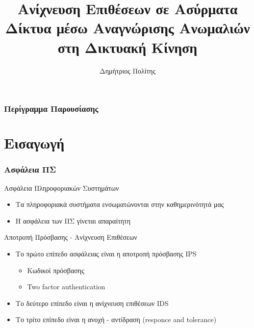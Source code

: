 \documentclass[handouts,hyperref={pdfpagelabels=false}]{beamer}
\begin{document}

\title{Ανίχνευση Επιθέσεων σε Ασύρματα Δίκτυα μέσω Αναγνώρισης Ανωμαλιών στη Δικτυακή Κίνηση}
\author{Δημήτριος Πολίτης}

\begin{frame}
\titlepage
\end{frame}

\begin{frame}
\frametitle{Περίγραμμα Παρουσίασης}
\tableofcontents
\end{frame}

\section{\foreignlanguage{greek}{Εισαγωγή}}
\begin{frame}
\frametitle{\foreignlanguage{greek}{Ασφάλεια ΠΣ}}

\begin{block}{Ασφάλεια Πληροφοριακών Συστημάτων}
\begin{itemize}
  \item Τα πληροφοριακά συστήματα ενσωματώνονται στην καθημερινότητά μας
  \item Η ασφάλεια των ΠΣ γίνεται απαραίτητη
\end{itemize}
\end{block}

\begin{block}{Αποτροπή Πρόσβασης - Ανίχνευση Επιθέσεων}
\begin{itemize}
  \item Το πρώτο επίπεδο ασφάλειας είναι η αποτροπή πρόσβασης \textlatin{IPS}
  \begin{itemize}
    \item Κωδικοί πρόσβασης
    \item \textlatin{Two factor authentication}
  \end{itemize}
  \item Το δεύτερο επίπεδο είναι η ανίχνευση επιθέσεων \textlatin{IDS}
  \item Το τρίτο επίπεδο είναι η ανοχή - αντίδραση (\textlatin{responce and tolerance})
\end{itemize}
\end{block}
\end{frame}
\end{document}
